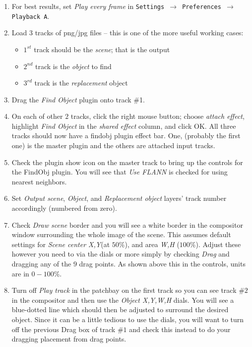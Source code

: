\begin{enumerate}
    \item For best results, set \textit{Play every frame} in \texttt{Settings $\rightarrow$ Preferences $\rightarrow$ Play\-back A}.
    \item Load 3 tracks of png/jpg files – this is one of the more useful working cases:
    \begin{itemize}
        \item $1^{st}$ track should be the \textit{scene}; that is the output
        \item $2^{nd}$ track is the \textit{object} to find
        \item $3^{rd}$ track is the \textit{replacement} object
    \end{itemize}
    \item Drag the \textit{Find Object} plugin onto track \#1.
    \item On each of other $2$ tracks, click the right mouse button;
      choose \textit{attach effect}, highlight \textit{Find Object}
      in the \textit{shared effect} column, and click OK\@. All
      three tracks should now have a findobj plugin effect bar. One,
      (probably the first one) is the master plugin and the others
      are attached input tracks.
    \item Check the plugin show icon on the master track to bring up the controls for the FindObj plugin. You will see that \textit{Use FLANN} is checked for using nearest neighbors.
    \item Set \textit{Output scene}, \textit{Object}, and \textit{Replacement object} layers’ track number accordingly (numbered from zero).
    \item Check \textit{Draw scene} border and you will see a white border in the compositor window surrounding the whole image of the scene. This assumes default settings for \textit{Scene center X,Y}(at $50\%$), and area \textit{W,H} ($100\%$). Adjust these however you need to via the dials or more simply by checking \textit{Drag} and dragging any of the $9$ drag points. As shown above this in the controls, units are in $0-100\%$.
    \item Turn off \textit{Play track} in the patchbay on the first track so you can see track $\#2$ in the compositor and then use the \textit{Object X,Y,W,H} dials. You will see a blue-dotted line which should then be adjusted to surround the desired object. Since it can be a little tedious to use the dials, you will want to turn off the previous Drag box of track $\#1$ and check this instead to do your dragging placement from drag points.

\end{enumerate}
